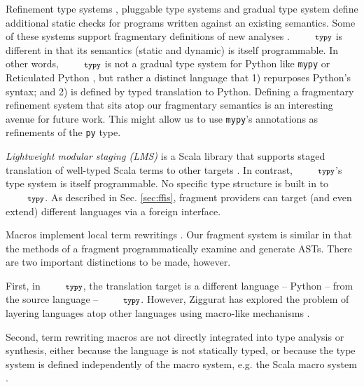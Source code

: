 \documentclass[10pt]{sigplanconf}
\newcommand{\typy}{\texttt{\footnotesize typy}}
\newcommand{\lip}[1]{\lstinline[language=Python,basicstyle=\ttfamily\footnotesize,morekeywords={with},deletendkeywords={tuple,buffer,map}]{#1}}
\newcommand{\li}[1]{\lip{#1}}
\begin{document}
Refinement type systems \cite{Freeman91}, pluggable type systems \cite{Brac04a,Andreae:2006:FIP:1167473.1167479,brown2016build,DBLP:journals/toplas/MarkstrumMEMAN10} and gradual type system \cite{Siek06a,siek2007gradual} define additional static checks for programs written against an existing semantics. Some of these systems support fragmentary definitions of new analyses \cite{DBLP:journals/toplas/MarkstrumMEMAN10,brown2016build}. $\typy$ is different in that its semantics (static and dynamic) is itself programmable. In other words, $\typy$ is not a gradual type system for Python like \texttt{mypy} \cite{mypy} or Reticulated Python \cite{DBLP:conf/dls/VitousekKSB14}, but rather a distinct language that 1) repurposes Python's syntax; and 2) is defined by typed translation to Python. %
Defining a fragmentary refinement system that sits atop our fragmentary semantics is an interesting avenue for future work. This might allow us to use \texttt{mypy}'s annotations as refinements of the \li{py} type.  %

\emph{Lightweight modular staging (LMS)} is a Scala library that supports staged translation of well-typed Scala terms to other targets \cite{Rompf:2012:LMS}. In contrast, $\typy$'s type system is itself  programmable. No specific type structure is built in to $\typy$. As described in Sec. \ref{sec:ffis}, fragment providers can target (and even extend) different languages via a foreign interface. %

Macros implement local term rewritings \cite{Hart63a}. Our fragment system is similar in that the methods of a fragment programmatically examine and generate ASTs. There are two important distinctions to be made, however. 

First, in $\typy$, the translation target is a different language -- Python -- from the source language -- $\typy$. However, Ziggurat has explored the problem of layering languages atop other languages using macro-like mechanisms \cite{DBLP:journals/jfp/FisherS08}.

Second, term rewriting macros are not directly integrated into type analysis or synthesis, either because the language is not statically typed, or because the type system is defined independently of the macro system, e.g. the Scala macro system \cite{ScalaMacros2013}. 
\end{document}
